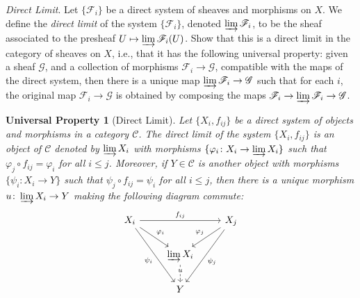 \documentclass[10pt]{article}
\newtheorem*{universalproperty}{Universal Property}
\theoremstyle{definition}
\theoremstyle{remark}
\numberwithin{equation}{section}
\numberwithin{figure}{subsubsection}
\begin{document}
\begin{problem}
  \emph{Direct Limit}. Let $\{\mathscr{F}_i\}$ be a direct system of sheaves and morphisms on $X$. We define the \emph{direct limit} of the system $\{\mathscr{F}_i\}$, denoted $\varinjlim \mathscr{F}_i$, to be the sheaf associated to the presheaf $U \mapsto \varinjlim \mathscr{F}_i(U)$. Show that this is a direct limit in the category of sheaves on $X$, i.e., that it has the following universal property: given a sheaf $\mathscr{G}$, and a collection of morphisms $\mathscr{F}_i \to \mathscr{G}$, compatible with the maps of the direct system, then there is a unique map $\varinjlim \mathscr{F}_i \to \mathscr{G}$ such that for each $i$, the original map $\mathscr{F}_i \to \mathscr{G}$ is obtained by composing the maps $\mathscr{F}_i \to \varinjlim\mathscr{F}_i \to \mathscr{G}$.
\end{problem}
\begin{universalproperty}[Direct Limit]
  Let $\{X_i,f_{ij}\}$ be a direct system of objects and morphisms in a category $\mathscr{C}$. The \emph{direct limit} of the system $\{X_i,f_{ij}\}$ is an object of $\mathscr{C}$ denoted by $\varinjlim X_i$ with morphisms $\{\varphi_i \colon X_i \to \varinjlim X_i\}$ such that $\varphi_j \circ f_{ij} = \varphi_i$ for all $i \le j$. Moreover, if $Y \in \mathscr{C}$ is another object with morphisms $\{\psi_i\colon X_i \to Y\}$ such that $\psi_j \circ f_{ij} = \psi_i$ for all $i \le j$, then there is a unique morphism $u\colon \varinjlim X_i \to Y$ making the following diagram commute:
  \begin{equation*}
    \begin{tikzcd}
      X_i \arrow{rr}{f_{ij}}\arrow{dr}{\varphi_i}\arrow{ddr}[swap]{\psi_i} & & X_j\arrow{dl}[swap]{\varphi_j}\arrow{ddl}{\psi_j}\\
      & \varinjlim X_i\arrow[dashed]{d}[description,yshift=3pt]{u}\\
      & Y
    \end{tikzcd}
  \end{equation*}
\end{universalproperty}
\end{document}
